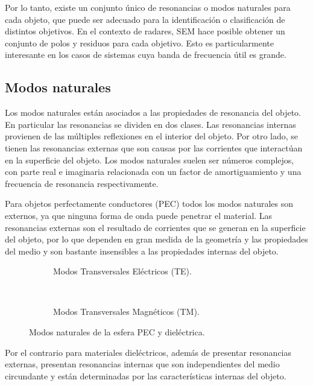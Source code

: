 Por lo tanto, existe un conjunto único de resonancias o modos naturales para cada objeto, que puede ser adecuado para la identificación o clasificación de distintos objetivos. En el contexto de radares, SEM hace posible obtener un conjunto de polos y residuos para cada objetivo. Esto es particularmente interesante en los casos de sistemas cuya banda de frecuencia útil es grande. 


 \subsection{Modos naturales}

Los modos naturales están asociados a las propiedades de resonancia del objeto. En particular las resonancias se dividen en dos clases. Las resonancias internas provienen de las múltiples reflexiones en el interior del objeto. Por otro lado, se tienen las resonancias externas que son causas por las corrientes que interactúan en la superficie del objeto. Los modos naturales suelen ser números complejos, con parte real e imaginaria relacionada con un factor de amortiguamiento y una frecuencia de resonancia respectivamente.

Para objetos perfectamente conductores (PEC) todos los modos naturales son externos, ya que ninguna forma de onda puede penetrar el material. Las resonancias externas son el resultado de corrientes que se generan en la superficie del objeto, por lo que dependen en gran medida de la geometría y las propiedades del medio y son bastante insensibles a las propiedades internas del objeto.
\begin{figure}[t]
	\centering 
	\begin{subfigure}{0.45\textwidth}
		\centering
		\resizebox{\linewidth}{!}{}
		\caption{Modos Transversales Eléctricos (TE).}
		\label{Fig:ModesTE}
	\end{subfigure}
	~
	\begin{subfigure}{0.45\textwidth}
		\centering
		\resizebox{\linewidth}{!}{}
		\caption{Modos Transversales Magnéticos (TM).}
		\label{Fig:ModesTM}
	\end{subfigure}
	\caption{Modos naturales de la esfera PEC y dieléctrica.}
	\label{Fig:Modes}
\end{figure} 

Por el contrario para materiales dieléctricos, además de presentar resonancias externas, presentan resonancias internas que son independientes del medio circundante y están determinadas por las características internas del objeto. 

